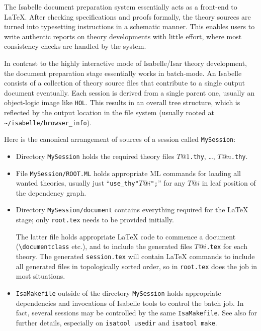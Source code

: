 \begin{isabellebody}
\begin{isamarkuptext}
  \medskip The Isabelle document preparation system essentially acts
  as a front-end to {\LaTeX}.  After checking specifications and
  proofs formally, the theory sources are turned into typesetting
  instructions in a schematic manner.  This enables users to write
  authentic reports on theory developments with little effort, where
  most consistency checks are handled by the system.%
\end{isamarkuptext}%
\isamarkuptrue%
%
\isamarkuptrue%
%
\begin{isamarkuptext}%
In contrast to the highly interactive mode of Isabelle/Isar theory
  development, the document preparation stage essentially works in
  batch-mode.  An Isabelle  consists of a collection
  of theory source files that contribute to a single output document
  eventually.  Each session is derived from a single parent one,
  usually an object-logic image like \texttt{HOL}.  This results in an
  overall tree structure, which is reflected by the output location in
  the file system (usually rooted at \verb,~/isabelle/browser_info,).

  \medskip Here is the canonical arrangement of sources of a session
  called \texttt{MySession}:

  \begin{itemize}

  \item Directory \texttt{MySession} holds the required theory files
  $T@1$\texttt{.thy}, \dots, $T@n$\texttt{.thy}.

  \item File \texttt{MySession/ROOT.ML} holds appropriate ML commands
  for loading all wanted theories, usually just
  ``\texttt{use_thy"$T@i$";}'' for any $T@i$ in leaf position of the
  dependency graph.

  \item Directory \texttt{MySession/document} contains everything
  required for the {\LaTeX} stage; only \texttt{root.tex} needs to be
  provided initially.

  The latter file holds appropriate {\LaTeX} code to commence a
  document (\verb,\documentclass, etc.), and to include the generated
  files $T@i$\texttt{.tex} for each theory.  The generated
  \texttt{session.tex} will contain {\LaTeX} commands to include all
  generated files in topologically sorted order, so
  \verb,, in \texttt{root.tex} does the job in most
  situations.

  \item \texttt{IsaMakefile} outside of the directory
  \texttt{MySession} holds appropriate dependencies and invocations of
  Isabelle tools to control the batch job.  In fact, several sessions
  may be controlled by the same \texttt{IsaMakefile}.  See also
  \cite{isabelle-sys} for further details, especially on
  \texttt{isatool usedir} and \texttt{isatool make}.


\end{itemize}
\end{isamarkuptext}
\end{isabellebody}
